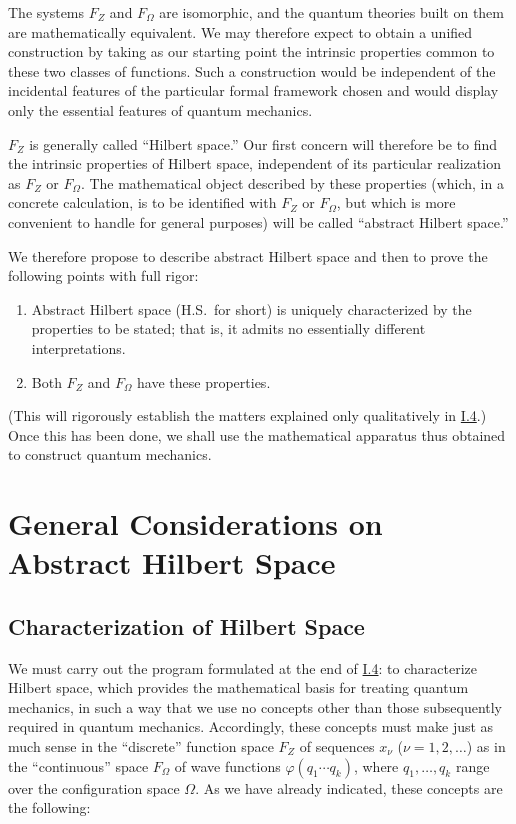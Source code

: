 \documentclass[fontsize=13pt,twoside,openany,headings=normal,parskip=false,bookmarkpackage=false,DIV=calc]{scrbook}
\begin{document}
The systems $F_Z$ and $F_\Omega$ are isomorphic, and the quantum theories built on them are mathematically equivalent. We may therefore expect to obtain a unified construction by taking as our starting point the intrinsic properties common to these two classes of functions. Such a construction would be independent of the incidental features of the particular formal framework chosen and would display only the essential features of quantum mechanics.

$F_Z$ is generally called ``Hilbert space.'' Our first concern will therefore be to find the intrinsic properties of Hilbert space, independent of its particular realization as $F_Z$ or $F_\Omega$. The mathematical object described by these properties (which, in a concrete calculation, is to be identified with $F_Z$ or $F_\Omega$, but which is more convenient to handle for general purposes) will be called ``abstract Hilbert space.''

We therefore propose to describe abstract Hilbert space and then to prove the following points with full rigor:
\begin{enumerate}
 \item Abstract Hilbert space (H.S.\ for short) is uniquely characterized by the properties to be stated; that is, it admits no essentially different interpretations.
 \item Both $F_Z$ and $F_\Omega$ have these properties.
\end{enumerate}
(This will rigorously establish the matters explained only qualitatively in \hyperref[sec:I.4]{I.4}.) Once this has been done, we shall use the mathematical apparatus thus obtained to construct quantum mechanics.


\chapter{General Considerations on Abstract Hilbert Space}\label{chap:II}
\section{Characterization of Hilbert Space}\label{sec:II.1}

We must carry out the program formulated at the end of \hyperref[sec:I.4]{I.4}: to characterize Hilbert space, which provides the mathematical basis for treating quantum mechanics, in such a way that we use no concepts other than those subsequently required in quantum mechanics. Accordingly, these concepts must make just as much sense in the ``discrete'' function space $F_Z$ of sequences $x_\nu$ ($\nu=1,2,\ldots$) as in the ``continuous'' space $F_\Omega$ of wave functions $\varphi(q_1\cdots q_k)$, where $q_1,\ldots,q_k$ range over the configuration space $\Omega$. As we have already indicated, these concepts are the following:
\end{document}

